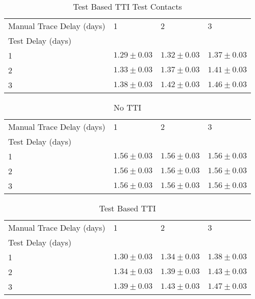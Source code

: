 \documentclass{article}
\begin{document}
    \begin{table}[H]
         \begin{tabular}{llll}
\toprule
Manual Trace Delay (days) &                1 &                2 &                3 \\
Test Delay (days) &                  &                  &                  \\
\midrule
1                 &  $1.29 \pm 0.03$ &  $1.32 \pm 0.03$ &  $1.37 \pm 0.03$ \\
2                 &  $1.33 \pm 0.03$ &  $1.37 \pm 0.03$ &  $1.41 \pm 0.03$ \\
3                 &  $1.38 \pm 0.03$ &  $1.42 \pm 0.03$ &  $1.46 \pm 0.03$ \\
\bottomrule
\end{tabular}

        \caption{Test Based TTI Test Contacts}
    \end{table}
    


    \begin{table}[H]
         \begin{tabular}{llll}
\toprule
Manual Trace Delay (days) &                1 &                2 &                3 \\
Test Delay (days) &                  &                  &                  \\
\midrule
1                 &  $1.56 \pm 0.03$ &  $1.56 \pm 0.03$ &  $1.56 \pm 0.03$ \\
2                 &  $1.56 \pm 0.03$ &  $1.56 \pm 0.03$ &  $1.56 \pm 0.03$ \\
3                 &  $1.56 \pm 0.03$ &  $1.56 \pm 0.03$ &  $1.56 \pm 0.03$ \\
\bottomrule
\end{tabular}

        \caption{No TTI}
    \end{table}
    


    \begin{table}[H]
         \begin{tabular}{llll}
\toprule
Manual Trace Delay (days) &                1 &                2 &                3 \\
Test Delay (days) &                  &                  &                  \\
\midrule
1                 &  $1.30 \pm 0.03$ &  $1.34 \pm 0.03$ &  $1.38 \pm 0.03$ \\
2                 &  $1.34 \pm 0.03$ &  $1.39 \pm 0.03$ &  $1.43 \pm 0.03$ \\
3                 &  $1.39 \pm 0.03$ &  $1.43 \pm 0.03$ &  $1.47 \pm 0.03$ \\
\bottomrule
\end{tabular}

        \caption{Test Based TTI}
    \end{table}
    
\end{document}
